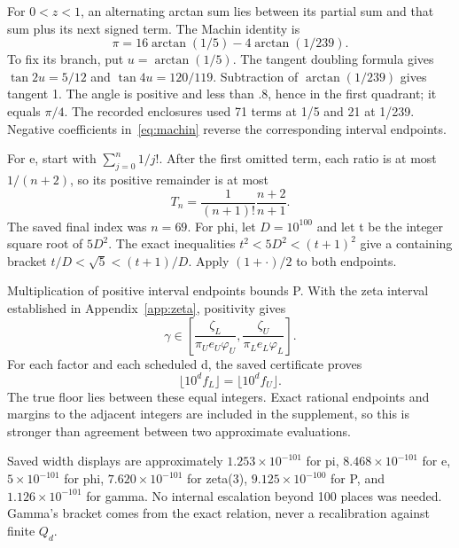 \documentclass[11pt,a4paper]{article}
\begin{document}
For $0<z<1$, an alternating arctan sum lies between its partial sum and that sum plus its next signed term. The Machin identity is
\begin{equation}
\pi=16\arctan(1/5)-4\arctan(1/239).
\label{eq:machin}
\end{equation}
To fix its branch, put $u=\arctan(1/5)$. The tangent doubling formula gives $\tan2u=5/12$ and $\tan4u=120/119$. Subtraction of $\arctan(1/239)$ gives tangent 1. The angle is positive and less than .8, hence in the first quadrant; it equals $\pi/4$. The recorded enclosures used 71 terms at 1/5 and 21 at 1/239. Negative coefficients in~\eqref{eq:machin} reverse the corresponding interval endpoints.

For e, start with $\sum_{j=0}^n1/j!$. After the first omitted term, each ratio is at most $1/(n+2)$, so its positive remainder is at most
\begin{equation}
T_n=\frac1{(n+1)!}\frac{n+2}{n+1}.
\label{eq:etail}
\end{equation}
The saved final index was $n=69$. For phi, let $D=10^{100}$ and let t be the integer square root of $5D^2$. The exact inequalities $t^2<5D^2<(t+1)^2$ give a containing bracket $t/D<\sqrt5<(t+1)/D$. Apply $(1+\cdot)/2$ to both endpoints.

Multiplication of positive interval endpoints bounds P. With the zeta interval established in Appendix~\ref{app:zeta}, positivity gives
\begin{equation}
\gamma\in\left[\frac{\zeta_L}{\pi_Ue_U\varphi_U},
\frac{\zeta_U}{\pi_Le_L\varphi_L}\right].
\label{eq:gammabounds}
\end{equation}
For each factor and each scheduled d, the saved certificate proves
\begin{equation}
\lfloor10^d f_L\rfloor=\lfloor10^d f_U\rfloor.
\label{eq:floors}
\end{equation}
The true floor lies between these equal integers. Exact rational endpoints and margins to the adjacent integers are included in the supplement, so this is stronger than agreement between two approximate evaluations.

Saved width displays are approximately $1.253\times10^{-101}$ for pi, $8.468\times10^{-101}$ for e, $5\times10^{-101}$ for phi, $7.620\times10^{-101}$ for zeta(3), $9.125\times10^{-100}$ for P, and $1.126\times10^{-101}$ for gamma. No internal escalation beyond 100 places was needed. Gamma's bracket comes from the exact relation, never a recalibration against finite $Q_d$.

\clearpage
\end{document}
